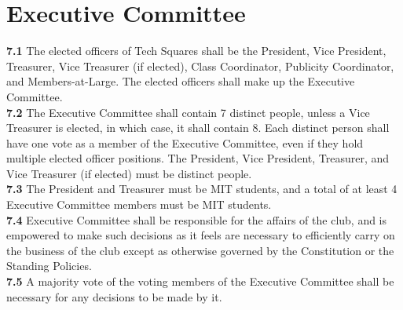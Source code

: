 \documentclass{article}
\begin{document}
\section{Executive Committee}
\textbf{7.1} The elected officers of Tech Squares shall be the President, Vice President, Treasurer, Vice Treasurer (if elected), Class Coordinator, Publicity Coordinator, and Members-at-Large. The elected officers shall make up the Executive Committee.\\
\textbf{7.2} The Executive Committee shall contain 7 distinct people, unless a Vice Treasurer is elected, in which case, it shall contain 8. Each distinct person shall have one vote as a member of the Executive Committee, even if they hold multiple elected officer positions. The President, Vice President, Treasurer, and Vice Treasurer (if elected) must be distinct people. \\
\textbf{7.3} The President and Treasurer must be MIT students, and a total of at least 4 Executive Committee members must be MIT students. \\
\textbf{7.4} Executive Committee  shall be responsible for the affairs of the club, and is empowered to make such decisions as it feels are necessary to efficiently carry on the business of the club except as otherwise governed by the Constitution or the Standing Policies.\\
\textbf{7.5} A majority vote of the voting members of the Executive Committee shall be necessary for any decisions to be made by it.\\
\end{document}
